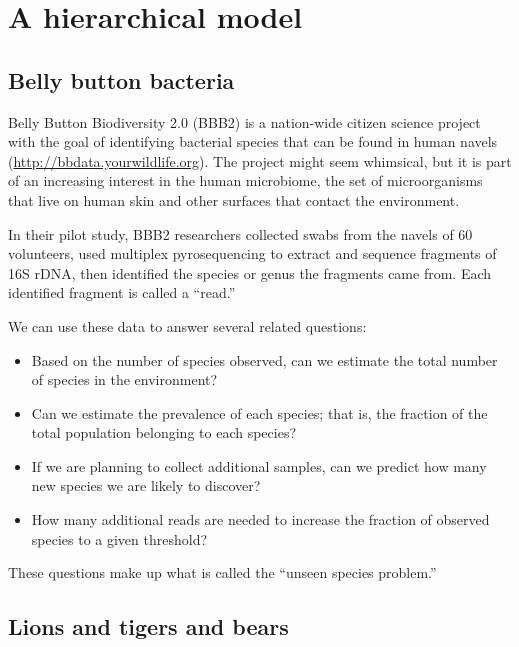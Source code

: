 \documentclass[12pt]{book}
\begin{document}
\chapter{A hierarchical model}
\label{species}

\section{Belly button bacteria}

Belly Button Biodiversity 2.0 (BBB2) is a nation-wide citizen
science project with the goal of identifying bacterial species that
can be found in human navels (\url{http://bbdata.yourwildlife.org}).
The project might seem whimsical, but it is part of an increasing
interest in the human microbiome, the set of microorganisms that live
on human skin and other surfaces that contact the environment.

In their pilot study, BBB2 researchers collected swabs from the navels
of 60 volunteers, used multiplex pyrosequencing to extract and sequence
fragments of 16S rDNA, then identified the species or genus the
fragments came from.  Each identified fragment is called a ``read.''

We can use these data to answer several related questions:

\begin{itemize}

\item Based on the number of species observed, can we estimate
  the total number of species in the environment?

\item Can we estimate the prevalence of each species; that is, the
  fraction of the total population belonging to each species?

\item If we are planning to collect additional samples, can we predict
  how many new species we are likely to discover?

\item How many additional reads are needed to increase the
  fraction of observed species to a given threshold?

\end{itemize}

These questions make up what is called the ``unseen species problem.''


\section{Lions and tigers and bears}
\end{document}
